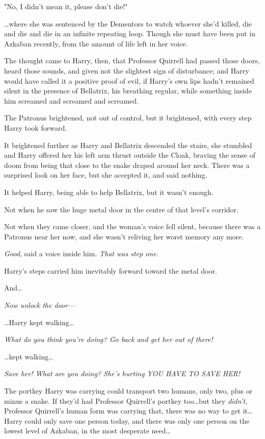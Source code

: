 "No, I didn't mean it, please don't die!"

…where she was sentenced by the Dementors to watch whoever she'd killed,
die and die and die in an infinite repeating loop. Though she must have been
put in Azkaban recently, from the amount of life left in her voice.

The thought came to Harry, then, that Professor Quirrell had passed those
doors, heard those sounds, and given not the slightest sign of disturbance; and
Harry would have called it a positive proof of evil, if Harry's own lips hadn't
remained silent in the presence of Bellatrix, his breathing regular, while
something inside him screamed and screamed and screamed.

The Patronus brightened, not out of control, but it brightened, with every step
Harry took forward.

It brightened further as Harry and Bellatrix descended the stairs, she stumbled
and Harry offered her his left arm thrust outside the Cloak, braving the sense
of doom from being that close to the snake draped around her neck. There was a
surprised look on her face, but she accepted it, and said nothing.

It helped Harry, being able to help Bellatrix, but it wasn't enough.

Not when he saw the huge metal door in the centre of that level's corridor.

Not when they came closer, and the woman's voice fell silent, because there was
a Patronus near her now, and she wasn't reliving her worst memory any more.

\emph{Good,} said a voice inside him. \emph{That was step one.}

Harry's steps carried him inevitably forward toward the metal door.

And…

\emph{Now unlock the door—}

…Harry kept walking…

\emph{What do you think you're doing? Go back and get her out of there!}

…kept walking…

\emph{Save her! What are you doing? She's hurting YOU HAVE TO SAVE HER!}

The portkey Harry was carrying could transport two humans, only two, plus or
minus a snake. If they'd had Professor Quirrell's portkey too…but they
\emph{didn't}, Professor Quirrell's human form was carrying that, there was no
way to get it…Harry could only save one person today, and there was
only one person on the lowest level of Azkaban, in the most desperate
need…

